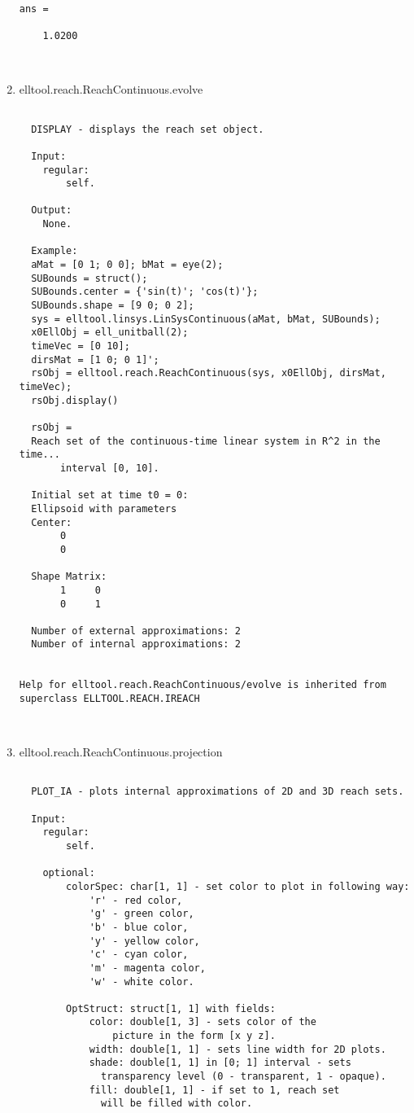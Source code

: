 \begin{enumerate}
\begin{lstlisting}
ans =

    1.0200



\end{lstlisting}
\fontfamily{\familydefault}
\selectfont
\item {elltool.reach.ReachContinuous.evolve}
\selectfont
\begin{lstlisting}

  DISPLAY - displays the reach set object.

  Input:
    regular:
        self.

  Output:
    None.

  Example:
  aMat = [0 1; 0 0]; bMat = eye(2);
  SUBounds = struct();
  SUBounds.center = {'sin(t)'; 'cos(t)'};
  SUBounds.shape = [9 0; 0 2];
  sys = elltool.linsys.LinSysContinuous(aMat, bMat, SUBounds);
  x0EllObj = ell_unitball(2);
  timeVec = [0 10];
  dirsMat = [1 0; 0 1]';
  rsObj = elltool.reach.ReachContinuous(sys, x0EllObj, dirsMat, timeVec);
  rsObj.display()

  rsObj =
  Reach set of the continuous-time linear system in R^2 in the time...
       interval [0, 10].

  Initial set at time t0 = 0:
  Ellipsoid with parameters
  Center:
       0
       0

  Shape Matrix:
       1     0
       0     1

  Number of external approximations: 2
  Number of internal approximations: 2


Help for elltool.reach.ReachContinuous/evolve is inherited from superclass ELLTOOL.REACH.IREACH



\end{lstlisting}
\fontfamily{\familydefault}
\selectfont
\item {elltool.reach.ReachContinuous.projection}
\selectfont
\begin{lstlisting}

  PLOT_IA - plots internal approximations of 2D and 3D reach sets.

  Input:
    regular:
        self.

    optional:
        colorSpec: char[1, 1] - set color to plot in following way:
            'r' - red color,
            'g' - green color,
            'b' - blue color,
            'y' - yellow color,
            'c' - cyan color,
            'm' - magenta color,
            'w' - white color.

        OptStruct: struct[1, 1] with fields:
            color: double[1, 3] - sets color of the
                picture in the form [x y z].
            width: double[1, 1] - sets line width for 2D plots.
            shade: double[1, 1] in [0; 1] interval - sets
              transparency level (0 - transparent, 1 - opaque).
            fill: double[1, 1] - if set to 1, reach set
              will be filled with color.


\end{lstlisting}
\end{enumerate}
